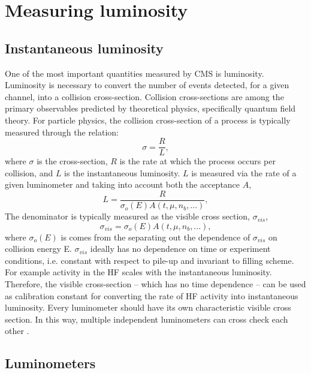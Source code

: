 
\chapter{Measuring luminosity}

\section{Instantaneous luminosity}

One of the most important quantities measured by CMS is luminosity. Luminosity is necessary to convert the number of events detected, for a given channel, into a collision cross-section. Collision cross-sections are among the primary observables predicted by theoretical physics, specifically quantum field theory. For particle physics, the collision cross-section of a process is typically measured through the relation:
\begin{equation}
\sigma  = \frac{R}{\mathit{L}} ,
\end{equation}
where $\sigma$ is the cross-section, $R$ is the rate at which the process occurs per collision, and $L$ is the instantaneous luminosity. $L$ is measured via the rate of a given luminometer and taking into account both the acceptance $A$,
\begin{equation}
L  = \frac{R}{ \sigma_{o}(E) A(t,\mu,n_b,...)} ,
\end{equation}
The denominator is typically measured as the visible cross section, $\sigma_{vis}$,
\begin{equation}
\sigma_{vis}  = \sigma_{o}(E) A(t,\mu,n_b,...),
\end{equation}
where $\sigma_{o}(E)$ is comes from the separating out the dependence of $\sigma_{vis}$ on collision energy E. $\sigma_{vis}$ ideally has no dependence on time or experiment conditions, i.e. constant with respect to pile-up and invariant to filling scheme. For example activity in the HF scales with the instantaneous luminosity. Therefore, the visible cross-section -- which has no time dependence -- can be used as calibration constant for converting the rate of HF activity into instantaneous luminosity. Every luminometer should have its own characteristic visible cross section. In this way, multiple independent luminometers can cross check each other \cite{CMS:2013gfa}.

\section{Luminometers}

